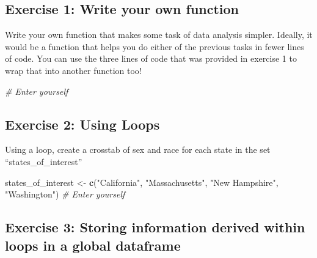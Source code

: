 \documentclass[
]{book}
\newenvironment{Shaded}{\begin{snugshade}}{\end{snugshade}}
\newcommand{\CommentTok}[1]{\textcolor[rgb]{0.56,0.35,0.01}{\textit{#1}}}
\newcommand{\KeywordTok}[1]{\textcolor[rgb]{0.13,0.29,0.53}{\textbf{#1}}}
\newcommand{\NormalTok}[1]{#1}
\newcommand{\StringTok}[1]{\textcolor[rgb]{0.31,0.60,0.02}{#1}}
\theoremstyle{definition}
\theoremstyle{definition}
\theoremstyle{definition}
\theoremstyle{remark}
\begin{document}
\hypertarget{exercise-1-write-your-own-function}{%
\subsection*{Exercise 1: Write your own function}\label{exercise-1-write-your-own-function}}

Write your own function that makes some task of data analysis simpler. Ideally, it would be a function that helps you do either of the previous tasks in fewer lines of code. You can use the three lines of code that was provided in exercise 1 to wrap that into another function too!

\begin{Shaded}
\begin{Highlighting}[]
\CommentTok{\# Enter yourself}
\end{Highlighting}
\end{Shaded}

\hypertarget{exercise-2-using-loops}{%
\subsection*{Exercise 2: Using Loops}\label{exercise-2-using-loops}}

Using a loop, create a crosstab of sex and race for each state in the set ``states\_of\_interest''

\begin{Shaded}
\begin{Highlighting}[]
\NormalTok{states\_of\_interest <{-}}\StringTok{ }\KeywordTok{c}\NormalTok{(}\StringTok{"California"}\NormalTok{, }\StringTok{"Massachusetts"}\NormalTok{, }\StringTok{"New Hampshire"}\NormalTok{, }\StringTok{"Washington"}\NormalTok{)}
\CommentTok{\# Enter yourself}
\end{Highlighting}
\end{Shaded}

\hypertarget{exercise-3-storing-information-derived-within-loops-in-a-global-dataframe}{%
\subsection*{Exercise 3: Storing information derived within loops in a global dataframe}\label{exercise-3-storing-information-derived-within-loops-in-a-global-dataframe}}
\end{document}
